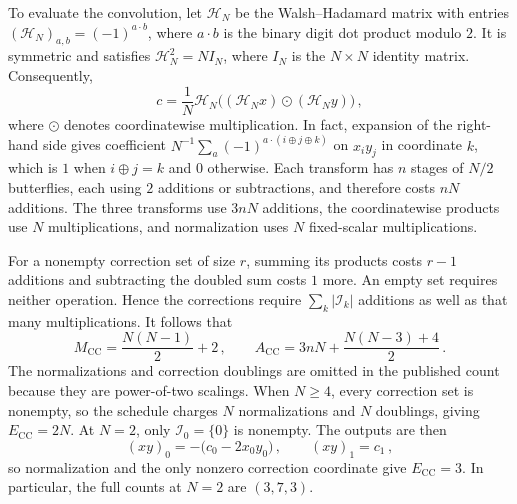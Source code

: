 \documentclass[11pt,reqno]{amsart}
\numberwithin{equation}{section}
\begin{document}
To evaluate the convolution, let $\mathcal H_N$ be the Walsh--Hadamard matrix
with entries $(\mathcal H_N)_{a,b}=(-1)^{a\cdot b}$, where $a\cdot b$ is the
binary digit dot product modulo $2$. It is symmetric and satisfies
$\mathcal H_N^2=NI_N$, where $I_N$ is the $N\times N$ identity matrix.
Consequently,
\[
c=\frac1N\mathcal H_N
 \bigl((\mathcal H_Nx)\odot(\mathcal H_Ny)\bigr)\,,
\]
where $\odot$ denotes coordinatewise multiplication. In fact, expansion
of the right-hand side gives coefficient
$N^{-1}\sum_a(-1)^{a\cdot(i\oplus j\oplus k)}$ on $x_i y_j$ in
coordinate $k$, which is $1$ when $i\oplus j=k$ and $0$ otherwise.
Each transform has $n$ stages of $N/2$ butterflies, each using $2$
additions or subtractions, and therefore costs $nN$ additions. The three
transforms use $3nN$ additions, the coordinatewise products use $N$
multiplications, and normalization uses $N$ fixed-scalar multiplications.

For a nonempty correction set of size $r$, summing its products costs
$r-1$ additions and subtracting the doubled sum costs $1$ more. An
empty set requires neither operation. Hence the corrections require
$\sum_k|\mathcal I_k|$ additions as well as that many multiplications.
It follows that
\[
M_{\mathrm{CC}}=\frac{N(N-1)}2+2\,,\qquad
A_{\mathrm{CC}}=3nN+\frac{N(N-3)+4}{2}\,.
\]
The normalizations and correction doublings are omitted in the published
count because they are power-of-two scalings. When $N\ge4$, every
correction set is nonempty, so the schedule charges $N$ normalizations
and $N$ doublings, giving $E_{\mathrm{CC}}=2N$. At $N=2$, only
$\mathcal I_0=\{0\}$ is nonempty. The outputs are then
\[
(xy)_0=-\bigl(c_0-2x_0y_0\bigr)\,,\qquad (xy)_1=c_1\,,
\]
so normalization and the only nonzero correction coordinate give
$E_{\mathrm{CC}}=3$. In particular, the full counts at $N=2$ are
$(3,7,3)$.
\end{document}
